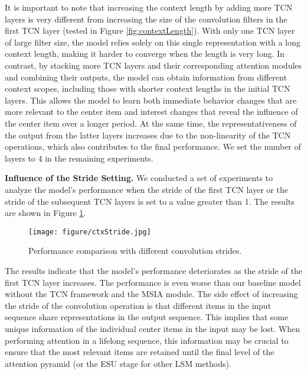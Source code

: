 It is important to note that increasing the context length by adding more TCN layers is very different from increasing the size of the convolution filters in the first TCN layer (tested in Figure \ref{fig:contextLength}). With only one TCN layer of large filter size, the model relies solely on this single representation with a long context length, making it harder to converge when the length is very long. In contrast, by stacking more TCN layers and their corresponding attention modules and combining their outputs, the model can obtain information from different context scopes, including those with shorter context lengths in the initial TCN layers. This allows the model to learn both immediate behavior changes that are more relevant to the center item and interest changes that reveal the influence of the center item over a longer period. At the same time, the representativeness of the output from the latter layers increases due to the non-linearity of the TCN operations, which also contributes to the final performance. We set the number of layers to 4 in the remaining experiments. 

\textbf{Influence of the Stride Setting.} We conducted a set of experiments to analyze the model's performance when the stride of the first TCN layer or the stride of the subsequent TCN layers is set to a value greater than 1. The results are shown in Figure \ref{fig:MSIAStride}.

\begin{figure}
    \centering
    \texttt{[image: figure/ctxStride.jpg]}
    \caption{Performance comparison with different convolution strides. }
    \label{fig:MSIAStride}
    \vspace{-0.7cm}
\end{figure}

The results indicate that the model's performance deteriorates as the stride of the first TCN layer increases. The performance is even worse than our baseline model without the TCN framework and the MSIA module. The side effect of increasing the stride of the convolution operation is that different items in the input sequence share representations in the output sequence. This implies that some unique information of the individual center items in the input may be lost. When performing attention in a lifelong sequence, this information may be crucial to ensure that the most relevant items are retained until the final level of the attention pyramid (or the ESU stage for other LSM methods). 

